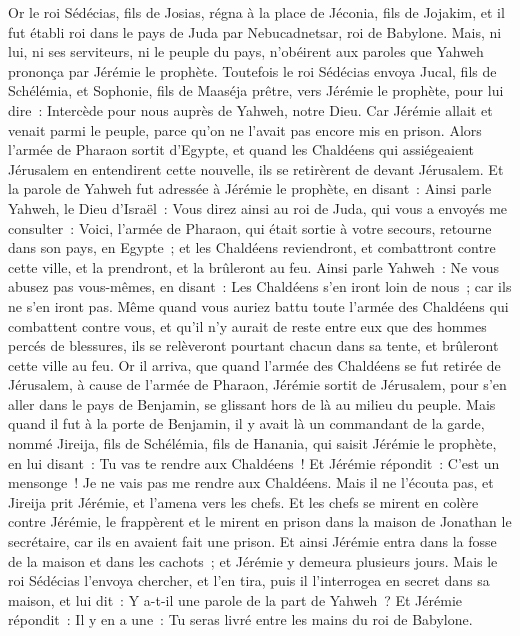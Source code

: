 \begin{multicols}{2}
\VerseOne{}Or le roi Sédécias, fils de Josias, régna à la place de Jéconia, fils de Jojakim, et il fut établi roi dans le pays de Juda par Nebucadnetsar, roi de Babylone.
Mais, ni lui, ni ses serviteurs, ni le peuple du pays, n'obéirent aux paroles que Yahweh prononça par Jérémie le prophète.
Toutefois le roi Sédécias envoya Jucal, fils de Schélémia, et Sophonie, fils de Maaséja prêtre, vers Jérémie le prophète, pour lui dire~: Intercède pour nous auprès de Yahweh, notre Dieu.
Car Jérémie allait et venait parmi le peuple, parce qu'on ne l'avait pas encore mis en prison.
Alors l'armée de Pharaon sortit d'Egypte, et quand les Chaldéens qui assiégeaient Jérusalem en entendirent cette nouvelle, ils se retirèrent de devant Jérusalem.
Et la parole de Yahweh fut adressée à Jérémie le prophète, en disant~:
Ainsi parle Yahweh, le Dieu d'Israël~: Vous direz ainsi au roi de Juda, qui vous a envoyés me consulter~: Voici, l'armée de Pharaon, qui était sortie à votre secours, retourne dans son pays, en Egypte~;
et les Chaldéens reviendront, et combattront contre cette ville, et la prendront, et la brûleront au feu.
Ainsi parle Yahweh~: Ne vous abusez pas vous-mêmes, en disant~: Les Chaldéens s'en iront loin de nous~; car ils ne s'en iront pas.
Même quand vous auriez battu toute l'armée des Chaldéens qui combattent contre vous, et qu'il n'y aurait de reste entre eux que des hommes percés de blessures, ils se relèveront pourtant chacun dans sa tente, et brûleront cette ville au feu.
Or il arriva, que quand l'armée des Chaldéens se fut retirée de Jérusalem, à cause de l'armée de Pharaon,
Jérémie sortit de Jérusalem, pour s'en aller dans le pays de Benjamin, se glissant hors de là au milieu du peuple.
Mais quand il fut à la porte de Benjamin, il y avait là un commandant de la garde, nommé Jireija, fils de Schélémia, fils de Hanania, qui saisit Jérémie le prophète, en lui disant~: Tu vas te rendre aux Chaldéens~!
Et Jérémie répondit~: C'est un mensonge~! Je ne vais pas me rendre aux Chaldéens. Mais il ne l'écouta pas, et Jireija prit Jérémie, et l'amena vers les chefs.
Et les chefs se mirent en colère contre Jérémie, le frappèrent et le mirent en prison dans la maison de Jonathan le secrétaire, car ils en avaient fait une prison.
Et ainsi Jérémie entra dans la fosse de la maison et dans les cachots~; et Jérémie y demeura plusieurs jours.
Mais le roi Sédécias l'envoya chercher, et l'en tira, puis il l'interrogea en secret dans sa maison, et lui dit~: Y a-t-il une parole de la part de Yahweh~? Et Jérémie répondit~: Il y en a une~: Tu seras livré entre les mains du roi de Babylone.

\end{multicols}
